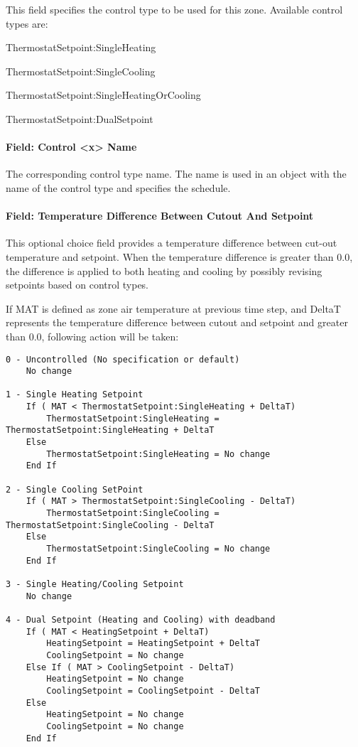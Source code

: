 This field specifies the control type to be used for this zone. Available control types are:

ThermostatSetpoint:SingleHeating

ThermostatSetpoint:SingleCooling

ThermostatSetpoint:SingleHeatingOrCooling

ThermostatSetpoint:DualSetpoint

\paragraph{Field: Control \textless{}x\textgreater{} Name}\label{field-control-x-name}

The corresponding control type name. The name is used in an object with the name of the control type and specifies the schedule.

\paragraph{Field: Temperature Difference Between Cutout And Setpoint}\label{field-temperature-difference-between-cutout-and-Setpoint}

This optional choice field provides a temperature difference between cut-out temperature and setpoint. When the temperature difference is greater than 0.0, the difference is applied to both heating and cooling by possibly revising setpoints based on control types.

If MAT is defined as zone air temperature at previous time step, and DeltaT represents the temperature difference between cutout and setpoint and greater than 0.0, following action will be taken: 

\begin{lstlisting}
0 - Uncontrolled (No specification or default)
	No change

1 - Single Heating Setpoint
	If ( MAT < ThermostatSetpoint:SingleHeating + DeltaT)
		ThermostatSetpoint:SingleHeating = ThermostatSetpoint:SingleHeating + DeltaT
	Else
		ThermostatSetpoint:SingleHeating = No change
	End If

2 - Single Cooling SetPoint
	If ( MAT > ThermostatSetpoint:SingleCooling - DeltaT)
		ThermostatSetpoint:SingleCooling = ThermostatSetpoint:SingleCooling - DeltaT
	Else
		ThermostatSetpoint:SingleCooling = No change
	End If

3 - Single Heating/Cooling Setpoint
	No change

4 - Dual Setpoint (Heating and Cooling) with deadband
	If ( MAT < HeatingSetpoint + DeltaT)
		HeatingSetpoint = HeatingSetpoint + DeltaT
		CoolingSetpoint = No change
	Else If ( MAT > CoolingSetpoint - DeltaT)
		HeatingSetpoint = No change
		CoolingSetpoint = CoolingSetpoint - DeltaT
	Else
		HeatingSetpoint = No change
		CoolingSetpoint = No change
	End If
\end{lstlisting}

